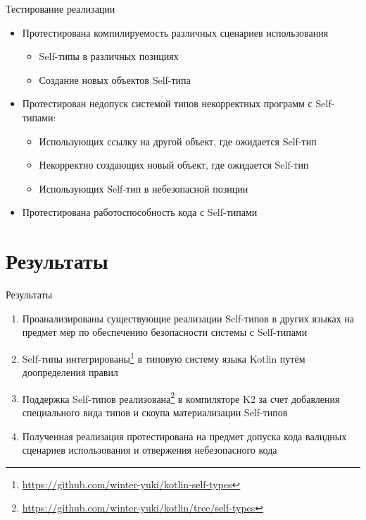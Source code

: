 \documentclass[aspectratio=169,usenames,dvipsnames]{beamer}
\begin{document}
    \begin{frame}{Тестирование реализации}

        \begin{itemize}
            \item Протестирована компилируемость различных сценариев использования
            \begin{itemize}
                \item Self-типы в различных позициях
                \item Создание новых объектов Self-типа
            \end{itemize}
            \item Протестирован недопуск системой типов некорректных программ с Self-типами:
            \begin{itemize}
                \item Использующих ссылку на другой объект, где ожидается Self-тип
                \item Некорректно создающих новый объект, где ожидается Self-тип
                \item Использующих Self-тип в небезопасной позиции
            \end{itemize}
            \item Протестирована работоспособность кода с Self-типами
        \end{itemize}
    \end{frame}


    \section{Результаты}

    \begin{frame}{Результаты}

        \begin{enumerate}
            \item Проанализированы существующие реализации Self-типов в других языках на предмет мер по обеспечению безопасности системы с Self-типами
            \item Self-типы интегрированы\footnote{\url{https://github.com/winter-yuki/kotlin-self-types}} в типовую систему языка Kotlin путём доопределения правил
            \item Поддержка Self-типов реализована\footnote{\url{https://github.com/winter-yuki/kotlin/tree/self-types}} в компиляторе K2 за счет добавления специального вида типов и скоупа материализации Self-типов
            \item Полученная реализация протестирована на предмет допуска кода валидных сценариев использования и отвержения небезопасного кода
        \end{enumerate}
    \end{frame}
\end{document}
